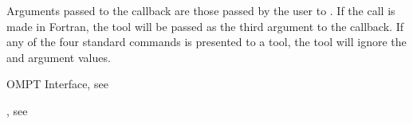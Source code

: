 Arguments passed to the callback are those passed by the user to
. If the call is made in Fortran, the tool
will be passed  as the third argument to the callback. If
any of the four standard commands is presented to a tool, the tool
will ignore the  and  argument values.



\begin{crossrefs}
\item OMPT Interface, see
\item {}, see
\end{crossrefs}


